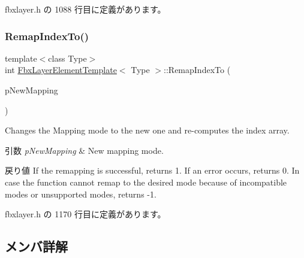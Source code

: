  fbxlayer.\+h の 1088 行目に定義があります。

\mbox{\label{class_fbx_layer_element_template_a971c29199bb9f0674045d2510230010a}} 
\subsubsection{\texorpdfstring{Remap\+Index\+To()}{RemapIndexTo()}}
{\footnotesize\ttfamily template$<$class Type$>$ \\
int \hyperlink{class_fbx_layer_element_template}{Fbx\+Layer\+Element\+Template}$<$ Type $>$\+::Remap\+Index\+To (\begin{DoxyParamCaption}\item[{\hyperlink{class_fbx_layer_element_a5a40e95db30ae9f94611dc3f1568af26}{Fbx\+Layer\+Element\+::\+E\+Mapping\+Mode}}]{p\+New\+Mapping }\end{DoxyParamCaption})\hspace{0.3cm}{\ttfamily [inline]}}

Changes the Mapping mode to the new one and re-\/computes the index array. 
\begin{DoxyParams}{引数}
{\em p\+New\+Mapping} & New mapping mode. \\
\hline
\end{DoxyParams}
\begin{DoxyReturn}{戻り値}
If the remapping is successful, returns 1. If an error occurs, returns 0. In case the function cannot remap to the desired mode because of incompatible modes or unsupported modes, returns -\/1. 
\end{DoxyReturn}


 fbxlayer.\+h の 1170 行目に定義があります。



\subsection{メンバ詳解}
\mbox{\label{class_fbx_layer_element_template_a0c7242aa361d91031b5137fbece371f3}} 
